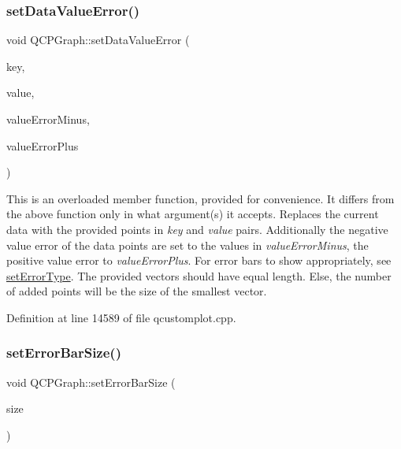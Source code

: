 \mbox{\label{class_q_c_p_graph_a3afbfd7222d739351c69387904776f93}} 
\subsubsection{\texorpdfstring{set\+Data\+Value\+Error()}{setDataValueError()}\hspace{0.1cm}{\footnotesize\ttfamily [2/2]}}
{\footnotesize\ttfamily void Q\+C\+P\+Graph\+::set\+Data\+Value\+Error (\begin{DoxyParamCaption}\item[{const Q\+Vector$<$ double $>$ \&}]{key,  }\item[{const Q\+Vector$<$ double $>$ \&}]{value,  }\item[{const Q\+Vector$<$ double $>$ \&}]{value\+Error\+Minus,  }\item[{const Q\+Vector$<$ double $>$ \&}]{value\+Error\+Plus }\end{DoxyParamCaption})}

This is an overloaded member function, provided for convenience. It differs from the above function only in what argument(s) it accepts. Replaces the current data with the provided points in {\itshape key} and {\itshape value} pairs. Additionally the negative value error of the data points are set to the values in {\itshape value\+Error\+Minus}, the positive value error to {\itshape value\+Error\+Plus}. For error bars to show appropriately, see \hyperlink{class_q_c_p_graph_ac3614d799c3894f2bc646e99c7f73d38}{set\+Error\+Type}. The provided vectors should have equal length. Else, the number of added points will be the size of the smallest vector. 

Definition at line 14589 of file qcustomplot.\+cpp.

\mbox{\label{class_q_c_p_graph_a10f50c5495ce45ef559ec2066194a335}} 
\subsubsection{\texorpdfstring{set\+Error\+Bar\+Size()}{setErrorBarSize()}}
{\footnotesize\ttfamily void Q\+C\+P\+Graph\+::set\+Error\+Bar\+Size (\begin{DoxyParamCaption}\item[{double}]{size }\end{DoxyParamCaption})}


